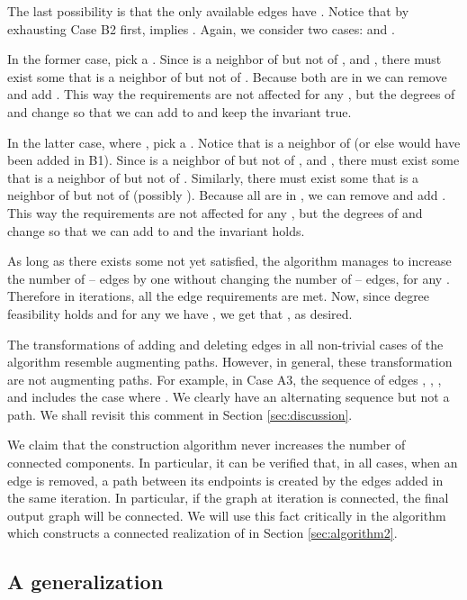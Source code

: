 \documentclass[12pt,a4paper]{article}
\theoremstyle{definition}
\theoremstyle{plain}
\newenvironment{prf}{\noindent {\bf Proof.}}{\begin{flushright}\vspace{-2em}\footnotesize\normalsize\end{flushright}\smallskip}
\begin{document}
\begin{prf}
The last possibility is that the only available 
edges have .
Notice that by exhausting Case B2 first, 
 implies .
Again, we consider two cases:  and .

In the former case, pick a . Since  is a 
neighbor of  but not of , 
and , there must exist some  that is a 
neighbor of  but not of . 
Because  both are in   
we can remove  and add . 
This way the  requirements are not affected for any , 
but the degrees of  and  change so that we can add  to  and keep
the invariant true.

In the latter case, where , 
pick a . Notice that 
is a neighbor of  
(or else  would have been added in B1). 
Since  is a neighbor of  but not of ,
and , 
there must exist some  that is a neighbor of  but not of . 
Similarly, there must exist some  that is a neighbor of  
but not of  (possibly ). 
Because  all are in , we can remove  
and add . This way the  requirements 
are not affected for any , but the degrees of  and  change 
so that we can add  to  and the invariant holds.

As long as there exists some  not yet satisfied, 
the algorithm manages to increase the number of -- edges
by one without changing the number of -- edges, 
for any . Therefore in 
iterations, all the edge requirements are met. 
Now, since degree feasibility holds and for any  
we have , 
we get that , as desired.
\end{prf}


 The transformations of  
adding and deleting edges in all non-trivial cases of the algorithm
resemble augmenting paths.
However, in general, these transformation are not
augmenting paths. For example, in Case A3,
the sequence of edges
, , ,
 and 
includes the case where .
We clearly have an alternating sequence but not a path.
We shall revisit this comment in Section \ref{sec:discussion}.\medskip

 We claim that the construction algorithm
never increases the number of connected components.
In particular, it can be verified that, in all cases, when
an edge is removed, a path between its endpoints is created 
by the edges added in the same iteration.
In particular, if the graph  at iteration  is connected,
the final output graph  will be connected.
We will use this fact critically in the algorithm
which constructs a connected realization of  
in Section \ref{sec:algorithm2}.



\subsection*{A generalization}
\label{sec:Generalizations}
\end{document}
